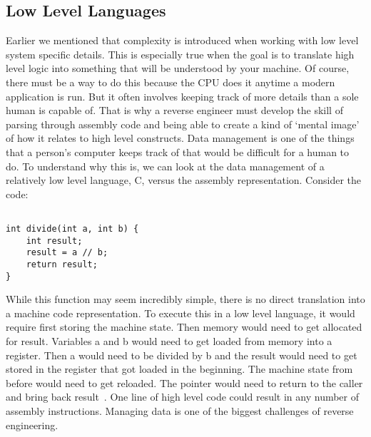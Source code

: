 \documentclass[12pt]{article}
\begin{document}
\subsection{Low Level Languages}
Earlier we mentioned that complexity is introduced when working with low level system specific details. This is especially true when the goal is to translate high level logic into something that will be understood by your machine. Of course, there must be a way to do this because the CPU does it anytime a modern application is run. But it often involves keeping track of more details than a sole human is capable of. That is why a reverse engineer must develop the skill of parsing through assembly code and being able to create a kind of ‘mental image’ of how it relates to high level constructs.
Data management is one of the things that a person’s computer keeps track of that would be difficult for a human to do. To understand why this is, we can look at the data management of a relatively low level language, C, versus the assembly representation. Consider the code: 
\begin{lstlisting}

int divide(int a, int b) {
    int result;
    result = a // b;
    return result;
}
\end{lstlisting}
While this function may seem incredibly simple, there is no direct translation into a machine code representation. To execute this in a low level language, it would require first storing the machine state. Then memory would need to get allocated for result. Variables a and b would need to get loaded from memory into a register. Then a would need to be divided by b and the result would need to get stored in the register that got loaded in the beginning. The machine state from before would need to get reloaded. The pointer would need to return to the caller and bring back result~\cite{Reversing}.
One line of high level code could result in any number of assembly instructions. Managing data is one of the biggest challenges of reverse engineering.
\end{document}
